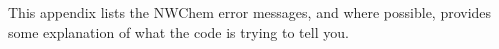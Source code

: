 
This appendix lists the NWChem error messages, and where possible, provides
some explanation of what the code is trying to tell you.
